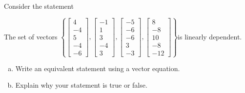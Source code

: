 
\begin{exerciseStatement}


Consider the statement 
\begin{center}\begin{minipage}{0.8\textwidth}
 The set of vectors \( \left\{ \left[\begin{array}{c}
4 \\
-4 \\
5 \\
-4 \\
-6
\end{array}\right] , \left[\begin{array}{c}
-1 \\
1 \\
3 \\
-4 \\
3
\end{array}\right] , \left[\begin{array}{c}
-5 \\
-6 \\
-6 \\
3 \\
-3
\end{array}\right] , \left[\begin{array}{c}
8 \\
-8 \\
10 \\
-8 \\
-12
\end{array}\right] \right\} \)is linearly dependent.
\end{minipage}\end{center}
    


\begin{enumerate}[(a)]
\item  Write an equivalent statement using a vector equation.
\item  Explain why your statement is true or false.
\end{enumerate}
    
\end{exerciseStatement}
    
